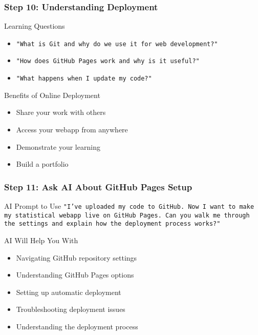 \documentclass[aspectratio=169]{beamer}
\begin{document}
\begin{frame}
\frametitle{Step 10: Understanding Deployment}
\begin{alertblock}{Learning Questions}
\begin{itemize}
\item \texttt{"What is Git and why do we use it for web development?"}
\item \texttt{"How does GitHub Pages work and why is it useful?"}
\item \texttt{"What happens when I update my code?"}
\end{itemize}
\end{alertblock}

\begin{exampleblock}{Benefits of Online Deployment}
\begin{itemize}
\item Share your work with others
\item Access your webapp from anywhere
\item Demonstrate your learning
\item Build a portfolio
\end{itemize}
\end{exampleblock}
\end{frame}

\begin{frame}
\frametitle{Step 11: Ask AI About GitHub Pages Setup}
\begin{alertblock}{AI Prompt to Use}
\texttt{"I've uploaded my code to GitHub. Now I want to make my statistical webapp live on GitHub Pages. Can you walk me through the settings and explain how the deployment process works?"}
\end{alertblock}

\begin{exampleblock}{AI Will Help You With}
\begin{itemize}
\item Navigating GitHub repository settings
\item Understanding GitHub Pages options
\item Setting up automatic deployment
\item Troubleshooting deployment issues
\item Understanding the deployment process
\end{itemize}
\end{exampleblock}
\end{frame}
\end{document}
